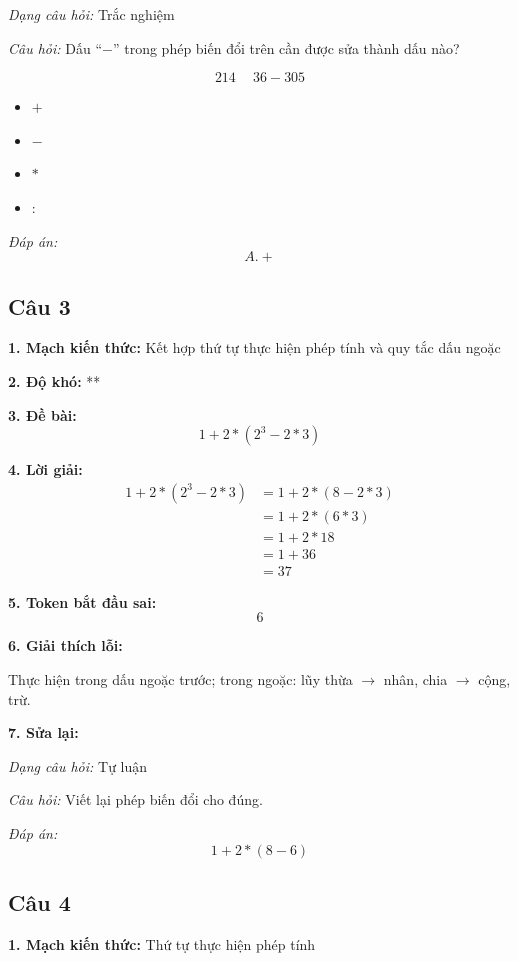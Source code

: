 \textit{Dạng câu hỏi:} Trắc nghiệm

\textit{Câu hỏi:} Dấu ``$-$'' trong phép biến đổi trên cần được sửa thành dấu nào?

\[
214 \boxed{\phantom{+}}36 - 305
\]

\begin{itemize}
    \item[A.] $+$
    \item[B.] $-$
    \item[C.] $*$
    \item[D.] $:$
\end{itemize}

\textit{Đáp án:}
\[
A. +
\]

\subsection*{Câu 3}

\noindent\textbf{1. Mạch kiến thức:} Kết hợp thứ tự thực hiện phép tính và quy tắc dấu ngoặc

\noindent\textbf{2. Độ khó:} **

\noindent\textbf{3. Đề bài:}
\[
1+2*(2^3-2*3)
\]

\noindent\textbf{4. Lời giải:}
\begin{align*}
1+2*(2^3-2*3)
    &= 1+2*(8-2*3) \\
    &= 1+2*(6*3) \\
    &= 1+2*18 \\
    &= 1+36 \\
    &= 37
\end{align*}

\noindent\textbf{5. Token bắt đầu sai:}
\[
6
\]

\noindent\textbf{6. Giải thích lỗi:}

Thực hiện trong dấu ngoặc trước; trong ngoặc: lũy thừa $\rightarrow$ nhân, chia $\rightarrow$ cộng, trừ.

\noindent\textbf{7. Sửa lại:}

\textit{Dạng câu hỏi:} Tự luận

\textit{Câu hỏi:} Viết lại phép biến đổi cho đúng.

\textit{Đáp án:}
\[
1+2*(8-6)
\]

\subsection*{Câu 4}

\noindent\textbf{1. Mạch kiến thức:} Thứ tự thực hiện phép tính

